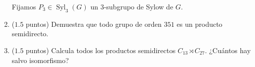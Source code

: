 \documentclass[12pt]{article}
\DeclareMathOperator{\Syl}{Syl}
\begin{document}
\begin{ejercicio}
\begin{enumerate}
            Fijamos $P_3 \in \Syl_3(G)$ un $3$-subgrupo de Sylow de $G$.
            \item ($1.5$ puntos) Demuestra que todo grupo de orden $351$ es un producto semidirecto.
            \item ($1.5$ puntos) Calcula todos los productos semidirectos $C_{13} \rtimes C_{27}$. ¿Cuántos hay salvo isomorfismo?
        \end{enumerate}
    \end{ejercicio}
\end{document}
